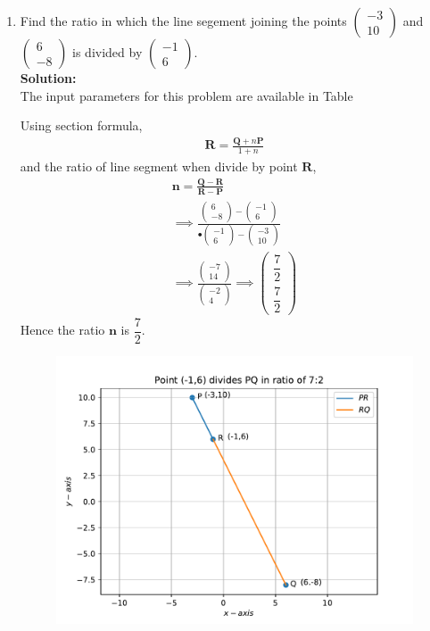\documentclass[12pt]{article}
\newcommand{\solution}{\noindent \textbf{Solution: }}
\newcommand{\myvec}[1]{\ensuremath{\begin{pmatrix}#1\end{pmatrix}}}
\let\vec\mathbf
\begin{document}
\begin{enumerate}

\item Find the ratio in which the line segement joining the points $\myvec{-3 \\ 10}$ and $\myvec{6\\-8}$ is divided by $\myvec{-1\\6}$.\\

\solution \\The input parameters for this problem are available in Table 
\begin{table}[ht!]

\caption{}
\label{Table-1} 
\end{table}

Using section formula,
\begin{align}
  \vec{R}=\frac{\vec{Q}+n\vec{P}}{1+n}
\end{align}
and the ratio of line segment when divide by point $\vec{R}$,
\begin{align}
\vec{n}=\frac{\vec{Q}-\vec{R}}{\vec{R}-\vec{P}}
\\
  \implies \frac{\myvec{6\\-8}-\myvec{-1\\6}}{•\myvec{-1\\6}-\myvec{-3\\10}}\\
  \implies \frac{\myvec{-7\\14}}{\myvec{-2\\4}}
  \implies \myvec{\dfrac{7}{2}  \\ \dfrac{7}{2}}
\end{align}
Hence the ratio $\vec{n}$ is $\dfrac{7}{2}$.
\begin{figure}[!h]
 \begin{center}
  \includegraphics[width=\columnwidth]{figs/fig.pdf}
 \end{center}
\caption{}
\label{fig:Fig1}
\end{figure}


\end{enumerate}
\end{document}
